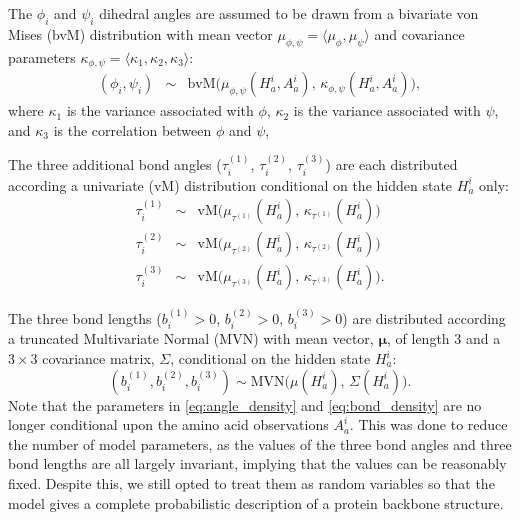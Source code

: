 \documentclass[nogrid]{MBE}%
\begin{document}
The $\phi_{i}$ and $\psi_{i}$ dihedral angles are assumed to be drawn from a bivariate von Mises (bvM) distribution with mean vector $\mu_{\phi,\psi}=\langle \mu_{\phi},\mu_{\psi} \rangle$ and covariance parameters $\kappa_{\phi,\psi}=\langle \kappa_{1},\kappa_{2},\kappa_{3} \rangle$:
\begin{equation}
\label{eq:phipsi_dist}
\begin{array}{ccc}
(\phi_{i},\psi_{i}) & \sim & \text{bvM}\big(\mu_{\phi,\psi}(H_{a}^{i},A_{a}^{i}),\,\ensuremath{\kappa_{\phi,\psi}(H_{a}^{i},A_{a}^{i})}\big),
\end{array}
\end{equation}
where $\kappa_{1}$ is the variance associated with $\phi$, $\kappa_{2}$ is the variance associated with $\psi$, and $\kappa_{3}$ is the correlation between $\phi$ and $\psi$,

The three additional bond angles ($\tau^{(1)}_{i}$, $\tau^{(2)}_{i}$, $\tau^{(3)}_{i}$) are each distributed according a univariate (vM) distribution conditional on the hidden state $H_{a}^{i}$ only:
\begin{equation}
\label{eq:angle_density}
\begin{array}{ccc}
\tau^{(1)}_{i} & \sim & \text{vM}\big(\mu_{\tau^{(1)}}(H_{a}^{i}),\,\ensuremath{\kappa_{\tau^{(1)}}(H_{a}^{i})}\big)
\\
\tau^{(2)}_{i} & \sim & \text{vM}\big(\mu_{\tau^{(2)}}(H_{a}^{i}),\,\ensuremath{\kappa_{\tau^{(2)}}(H_{a}^{i})}\big)
\\
\tau^{(3)}_{i} & \sim & \text{vM}\big(\mu_{\tau^{(3)}}(H_{a}^{i}),\,\ensuremath{\kappa_{\tau^{(3)}}(H_{a}^{i})}\big).
\end{array}
\end{equation}

The three bond lengths ($b_{i}^{(1)}>0$, $b_{i}^{(2)}>0$, $b_{i}^{(3)}>0$) are 
distributed according a truncated Multivariate Normal (MVN)
with mean vector, $\mathbf{\mu}$, of length 3 and a $3 \times 3$ covariance matrix, $\Sigma$, conditional on the hidden state $H_{a}^{i}$:
\begin{equation}
\label{eq:bond_density}
(b_{i}^{(1)}, b_{i}^{(2)}, b_{i}^{(3)})  \sim \text{MVN}\big(\mu(H_a^{i}),\,\Sigma(H_a^{i})\big).
\end{equation}
Note that the parameters in \eqref{eq:angle_density} and \eqref{eq:bond_density} are no longer conditional upon the amino acid observations $A_{a}^{i}$. This was done to reduce the number of model parameters, as the values of the three bond angles and three bond lengths are all largely invariant, implying that the values can be reasonably fixed. Despite this, we still opted to treat them as random variables so that the model gives a complete probabilistic description of a protein backbone structure.
\end{document}
